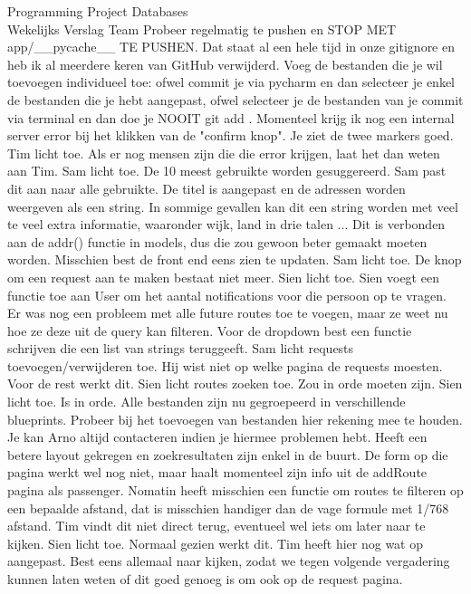 \documentclass{article}
\newcounter{team}
\begin{document}
\begin{Minutes}{Programming Project Databases \\ Wekelijks Verslag Team }
		            Probeer regelmatig te pushen en STOP MET app/\_\_pycache\_\_ TE PUSHEN. Dat staat al een hele tijd in onze gitignore en heb ik al meerdere keren van GitHub verwijderd. Voeg de bestanden die je wil toevoegen individueel toe: ofwel commit je via pycharm en dan selecteer je enkel de bestanden die je hebt aangepast, ofwel selecteer je de bestanden van je commit via terminal en dan doe je NOOIT git add .
				    Momenteel krijg ik nog een internal server error bij het klikken van de "confirm knop". Je ziet de twee markers goed. Tim licht toe. Als er nog mensen zijn die die error krijgen, laat het dan weten aan Tim.
			        Sam licht toe. De 10 meest gebruikte worden gesuggereerd. Sam past dit aan naar alle gebruikte.
					De titel is aangepast en de adressen worden weergeven als een string. In sommige gevallen kan dit een string worden met veel te veel extra informatie, waaronder wijk, land in drie talen ... Dit is verbonden aan de addr() functie in models, dus die zou gewoon beter gemaakt moeten worden.
				    Misschien best de front end eens zien te updaten. Sam licht toe. De knop om een request aan te maken bestaat niet meer.
				  Sien licht toe. Sien voegt een functie toe aan User om het aantal notifications voor die persoon op te vragen. Er was nog een probleem met alle future routes toe te voegen, maar ze weet nu hoe ze deze uit de query kan filteren. Voor de dropdown best een functie schrijven die een list van strings teruggeeft.
				    Sam licht requests toevoegen/verwijderen toe. Hij wist niet op welke pagina  de requests moesten. Voor de rest werkt dit.
				    Sien licht routes zoeken toe.
				    Zou in orde moeten zijn. Sien licht toe. Is in orde.
				    Alle bestanden zijn nu gegroepeerd in verschillende blueprints. Probeer bij het toevoegen van bestanden hier rekening mee te houden. Je kan Arno altijd contacteren indien je hiermee problemen hebt.
				    Heeft een betere layout gekregen en zoekresultaten zijn enkel in de buurt. De form op die pagina werkt wel nog niet, maar haalt momenteel zijn info uit de addRoute pagina als passenger. Nomatin heeft misschien een functie om routes te filteren op een bepaalde afstand, dat is misschien handiger dan de vage formule met 1/768 afstand. Tim vindt dit niet direct terug, eventueel wel iets om later naar te kijken.
				    Sien licht toe. Normaal gezien werkt dit.
				    Tim heeft hier nog wat op aangepast. Best eens allemaal naar kijken, zodat we tegen volgende vergadering kunnen laten weten of dit goed genoeg is om ook op de request pagina.


\end{Minutes}
\end{document}
